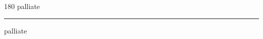 
\begin{frame}
\begin{center}
\begin{turn}{180}
{\fontsize{2.5cm}{1em}\selectfont palliate}
\end{turn}
\vspace{1em}\par  
\hrule
\vspace{1em}\par  
{\fontsize{2.5cm}{1em}\selectfont palliate}
\end{center}
\end{frame}
